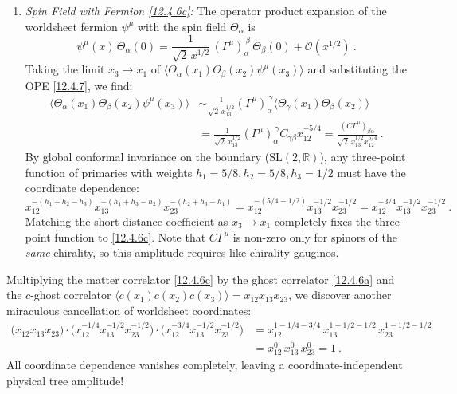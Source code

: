 \begin{tcolorbox}[breakable]
\begin{remark}
\begin{enumerate}
			\item \emph{Spin Field with Fermion \eqref{12.4.6c}:} The operator product expansion of the worldsheet fermion $\psi^{\mu}$ with the spin field $\Theta_{\alpha}$ is
			\begin{equation}
				\psi^{\mu}(x)\,\Theta_{\alpha}(0) = \frac{1}{\sqrt{2}\,x^{1/2}}\,(\Gamma^{\mu})_{\alpha}^{\ \beta}\,\Theta_{\beta}(0) + \mathcal{O}(x^{1/2}) \:. \label{12.4.7}
			\end{equation}
			Taking the limit $x_{3} \to x_{1}$ of $\langle \Theta_{\alpha}(x_{1})\Theta_{\beta}(x_{2})\psi^{\mu}(x_{3})\rangle$ and substituting the OPE \eqref{12.4.7}, we find:
			\begin{align*}
				\langle \Theta_{\alpha}(x_{1})\Theta_{\beta}(x_{2})\psi^{\mu}(x_{3})\rangle &\sim \frac{1}{\sqrt{2}\,x_{13}^{1/2}}(\Gamma^{\mu})_{\alpha}^{\ \gamma}\langle \Theta_{\gamma}(x_{1})\Theta_{\beta}(x_{2})\rangle \\
				&= \frac{1}{\sqrt{2}\,x_{13}^{1/2}}(\Gamma^{\mu})_{\alpha}^{\ \gamma}C_{\gamma\beta}x_{12}^{-5/4} = \frac{(C\Gamma^{\mu})_{\beta\alpha}}{\sqrt{2}\,x_{13}^{1/2}x_{12}^{5/4}} \:.
			\end{align*}
			By global conformal invariance on the boundary ($\mathrm{SL}(2,\mathbb{R})$), any three-point function of primaries with weights $h_{1}=5/8, h_{2}=5/8, h_{3}=1/2$ must have the coordinate dependence:
			\[
			x_{12}^{-(h_{1}+h_{2}-h_{3})}x_{13}^{-(h_{1}+h_{3}-h_{2})}x_{23}^{-(h_{2}+h_{3}-h_{1})} = x_{12}^{-(5/4-1/2)}x_{13}^{-1/2}x_{23}^{-1/2} = x_{12}^{-3/4}x_{13}^{-1/2}x_{23}^{-1/2} \:.
			\]
			Matching the short-distance coefficient as $x_{3}\to x_{1}$ completely fixes the three-point function to \eqref{12.4.6c}. Note that $C\Gamma^{\mu}$ is non-zero only for spinors of the \emph{same} chirality, so this amplitude requires like-chirality gauginos.
		\end{enumerate}
	\end{remark}
\end{tcolorbox}

Multiplying the matter correlator \eqref{12.4.6c} by the ghost correlator \eqref{12.4.6a} and the $c$-ghost correlator $\langle c(x_{1})c(x_{2})c(x_{3})\rangle = x_{12}x_{13}x_{23}$, we discover another miraculous cancellation of worldsheet coordinates:
\begin{align}
	\bigl(x_{12}x_{13}x_{23}\bigr) \cdot \bigl(x_{12}^{-1/4}x_{13}^{-1/2}x_{23}^{-1/2}\bigr) \cdot \bigl(x_{12}^{-3/4}x_{13}^{-1/2}x_{23}^{-1/2}\bigr) &= x_{12}^{1 - 1/4 - 3/4}\,x_{13}^{1 - 1/2 - 1/2}\,x_{23}^{1 - 1/2 - 1/2} \nonumber \\
	&= x_{12}^{0}\,x_{13}^{0}\,x_{23}^{0} = 1 \:.
\end{align}
All coordinate dependence vanishes completely, leaving a coordinate-independent physical tree amplitude!

